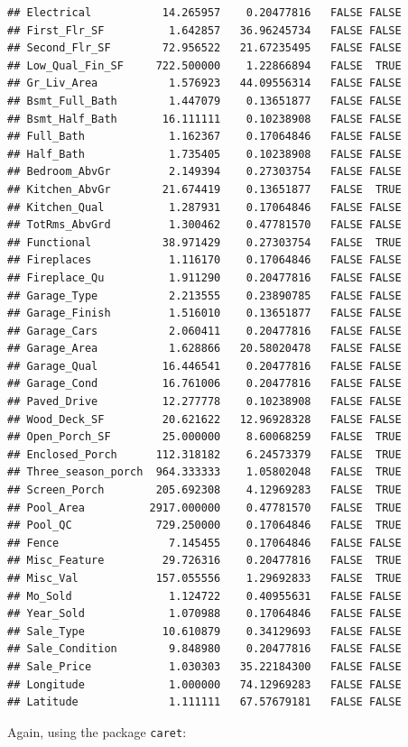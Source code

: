 \documentclass[
]{book}
\begin{document}
\begin{verbatim}
## Electrical           14.265957    0.20477816   FALSE FALSE
## First_Flr_SF          1.642857   36.96245734   FALSE FALSE
## Second_Flr_SF        72.956522   21.67235495   FALSE FALSE
## Low_Qual_Fin_SF     722.500000    1.22866894   FALSE  TRUE
## Gr_Liv_Area           1.576923   44.09556314   FALSE FALSE
## Bsmt_Full_Bath        1.447079    0.13651877   FALSE FALSE
## Bsmt_Half_Bath       16.111111    0.10238908   FALSE FALSE
## Full_Bath             1.162367    0.17064846   FALSE FALSE
## Half_Bath             1.735405    0.10238908   FALSE FALSE
## Bedroom_AbvGr         2.149394    0.27303754   FALSE FALSE
## Kitchen_AbvGr        21.674419    0.13651877   FALSE  TRUE
## Kitchen_Qual          1.287931    0.17064846   FALSE FALSE
## TotRms_AbvGrd         1.300462    0.47781570   FALSE FALSE
## Functional           38.971429    0.27303754   FALSE  TRUE
## Fireplaces            1.116170    0.17064846   FALSE FALSE
## Fireplace_Qu          1.911290    0.20477816   FALSE FALSE
## Garage_Type           2.213555    0.23890785   FALSE FALSE
## Garage_Finish         1.516010    0.13651877   FALSE FALSE
## Garage_Cars           2.060411    0.20477816   FALSE FALSE
## Garage_Area           1.628866   20.58020478   FALSE FALSE
## Garage_Qual          16.446541    0.20477816   FALSE FALSE
## Garage_Cond          16.761006    0.20477816   FALSE FALSE
## Paved_Drive          12.277778    0.10238908   FALSE FALSE
## Wood_Deck_SF         20.621622   12.96928328   FALSE FALSE
## Open_Porch_SF        25.000000    8.60068259   FALSE  TRUE
## Enclosed_Porch      112.318182    6.24573379   FALSE  TRUE
## Three_season_porch  964.333333    1.05802048   FALSE  TRUE
## Screen_Porch        205.692308    4.12969283   FALSE  TRUE
## Pool_Area          2917.000000    0.47781570   FALSE  TRUE
## Pool_QC             729.250000    0.17064846   FALSE  TRUE
## Fence                 7.145455    0.17064846   FALSE FALSE
## Misc_Feature         29.726316    0.20477816   FALSE  TRUE
## Misc_Val            157.055556    1.29692833   FALSE  TRUE
## Mo_Sold               1.124722    0.40955631   FALSE FALSE
## Year_Sold             1.070988    0.17064846   FALSE FALSE
## Sale_Type            10.610879    0.34129693   FALSE FALSE
## Sale_Condition        9.848980    0.20477816   FALSE FALSE
## Sale_Price            1.030303   35.22184300   FALSE FALSE
## Longitude             1.000000   74.12969283   FALSE FALSE
## Latitude              1.111111   67.57679181   FALSE FALSE
\end{verbatim}

Again, using the package \texttt{caret}:
\end{document}
